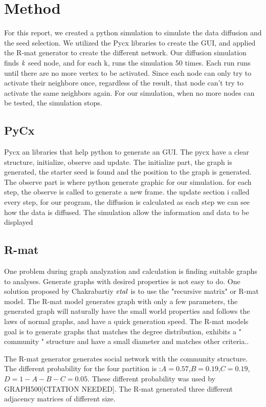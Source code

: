 \chapter{Method}
For this report, we created a python simulation to simulate the data diffusion and the seed selection. We utilized the Pycx libraries to create the GUI, and applied the R-mat generator to create the different network. Our diffusion simulation finds $\it{k}$ seed node, and for each k, runs the simulation 50 times. Each run runs until there are no more vertex to be activated. Since each node can only try to activate their neighbore once, regardless of the result, that node can't try to activate the same neighbors again. For our simulation, when no more nodes can be tested, the simulation stops. 

\section{PyCx}
Pycx an libraries that help python to generate an GUI\cite{Pycx}. The pycx have a clear structure, initialize, observe and update. The initialize part, the graph is generated, the starter seed is found and the position to the graph is generated. The observe part is where python generate graphic for our simulation. for each step, the observe is called to generate a new frame. the update section i called every step, for our program, the diffusion is calculated as each step we can see how the data is diffused. The simulation allow the information and data to be displayed 


\section{R-mat}
One problem during graph analyzation and calculation is finding suitable graphs to analyses. Generate graphs with desired properties is not easy to do. One solution proposed by Chakrabartiy $\it{et al}$ is to use the "recursive matrix" or R-mat model. The R-mat model generates graph with only a few parameters, the generated graph will naturally have the small world properties and follows the laws of normal graphs, and have a quick generation speed\cite{Rmat2004}. The R-mat models goal is to generate graphs that matches the degree distribution, exhibits a " community " structure and have a small diameter and matches other criteria.\cite{Rmat2004}.

The R-mat generator generates social network with the community structure. The different probability for the four partition is :$A=0.57$,$B=0.19$,$C=0.19$,$D = 1-A-B-C = 0.05$. These different probability was used by GRAPH500[CITATION NEEDED]. The R-mat generated three different adjacency matrices of different size.


